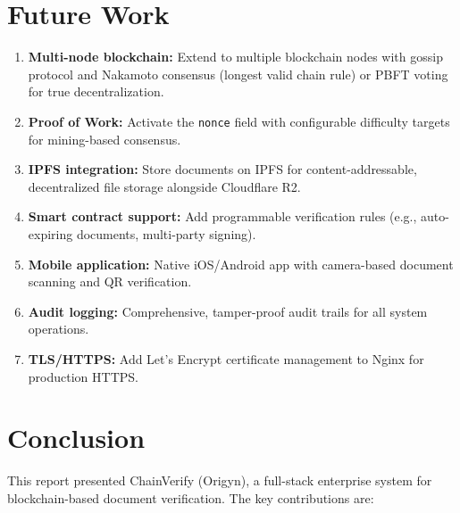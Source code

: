 \documentclass[12pt, a4paper]{report}
\begin{document}
\chapter{Future Work}

\begin{enumerate}
    \item \textbf{Multi-node blockchain:} Extend to multiple blockchain nodes
          with gossip protocol and Nakamoto consensus (longest valid chain rule)
          or PBFT voting for true decentralization.
    \item \textbf{Proof of Work:} Activate the \texttt{nonce} field with
          configurable difficulty targets for mining-based consensus.
    \item \textbf{IPFS integration:} Store documents on IPFS for
          content-addressable, decentralized file storage alongside Cloudflare R2.
    \item \textbf{Smart contract support:} Add programmable verification rules
          (e.g., auto-expiring documents, multi-party signing).
    \item \textbf{Mobile application:} Native iOS/Android app with camera-based
          document scanning and QR verification.
    \item \textbf{Audit logging:} Comprehensive, tamper-proof audit trails for
          all system operations.
    \item \textbf{TLS/HTTPS:} Add Let's Encrypt certificate management to
          Nginx for production HTTPS.
\end{enumerate}


\chapter{Conclusion}

This report presented ChainVerify (Origyn), a full-stack enterprise system for
blockchain-based document verification. The key contributions are:
\end{document}
